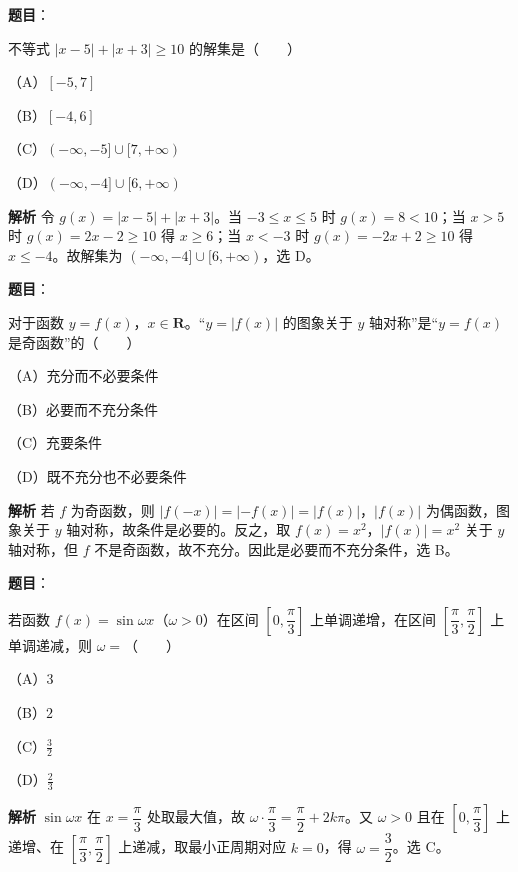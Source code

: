 \begin{answer}

\textbf{题目}：

不等式 $|x-5|+|x+3|\geqslant10$ 的解集是\mbox{（　　）}

（A）$[-5,7]$

（B）$[-4,6]$

（C）$(-\infty,-5]\cup[7,+\infty)$

（D）$(-\infty,-4]\cup[6,+\infty)$

\textbf{解析}
令 $g(x)=|x-5|+|x+3|$。当 $-3\leqslant x\leqslant5$ 时 $g(x)=8<10$；当 $x>5$ 时 $g(x)=2x-2\geqslant10$ 得 $x\geqslant6$；当 $x<-3$ 时 $g(x)=-2x+2\geqslant10$ 得 $x\leqslant-4$。故解集为 $(-\infty,-4]\cup[6,+\infty)$，选 D。


\end{answer}
\begin{answer}

\textbf{题目}：

对于函数 $y=f(x)$，$x\in\mathbf R$。“$y=|f(x)|$ 的图象关于 $y$ 轴对称”是“$y=f(x)$ 是奇函数”的\mbox{（　　）}

（A）充分而不必要条件

（B）必要而不充分条件

（C）充要条件

（D）既不充分也不必要条件

\textbf{解析}
若 $f$ 为奇函数，则 $|f(-x)|=|-f(x)|=|f(x)|$，$|f(x)|$ 为偶函数，图象关于 $y$ 轴对称，故条件是必要的。反之，取 $f(x)=x^2$，$|f(x)|=x^2$ 关于 $y$ 轴对称，但 $f$ 不是奇函数，故不充分。因此是必要而不充分条件，选 B。


\end{answer}
\begin{answer}

\textbf{题目}：

若函数 $f(x)=\sin\omega x$（$\omega>0$）在区间 $\left[0,\dfrac{\pi}{3}\right]$ 上单调递增，在区间 $\left[\dfrac{\pi}{3},\dfrac{\pi}{2}\right]$ 上单调递减，则 $\omega=$\mbox{（　　）}

（A）$3$

（B）$2$

（C）$\frac32$

（D）$\frac23$

\textbf{解析}
$\sin\omega x$ 在 $x=\dfrac{\pi}{3}$ 处取最大值，故 $\omega\cdot\dfrac\pi3=\dfrac\pi2+2k\pi$。又 $\omega>0$ 且在 $\left[0,\dfrac\pi3\right]$ 上递增、在 $\left[\dfrac\pi3,\dfrac\pi2\right]$ 上递减，取最小正周期对应 $k=0$，得 $\omega=\dfrac32$。选 C。


\end{answer}
